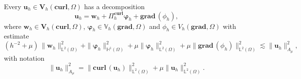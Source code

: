 \begin{proposition}\label{prop:Hitpmair-Xu decomposition}
Every $\bm{u}_h \in \bm{V}_h(\textbf{curl},\Omega)$ has a decomposition 
\begin{equation}\label{eq:Hitpmair-Xu-decomposition}
\bm{u}_h=\bm{w}_h+\Pi_h^{\textbf{curl}} \bm{\varphi}_h + \textbf{grad}\,(\phi_h),
\end{equation}
where $\bm{w}_h \in \bm{V}_h(\textbf{curl},\Omega)$, $\bm{\varphi}_h \in  \mathbb{V}_h(\textbf{grad},\Omega)$ and $\phi_h \in V_h(\textbf{grad},\Omega)$ with estimate
\begin{equation}\label{eq:Hitpmair-Xu-decomposition-estimate}
(h^{-2} + \mu) \, \|\bm{w}_h\|_{\mathbb{L}^2(\Omega)}^2 + \|\bm{\varphi}_h\|_{\mathbb{H}^1(\Omega)}^2 + \mu \|\bm{\varphi}_h\|_{\mathbb{L}^2(\Omega)}^2 + \mu \|\textbf{grad}\,(\phi_h)\|_{\mathbb{L}^2(\Omega)}^2 \lesssim \|\bm{u}_h\|_{A_\mu}^2,
\end{equation}
with notation
$$
\|\bm{u}_h\|_{A_\mu}^2= \|\textbf{curl} \,(\bm{u}_h)\|_{\mathbb{L}^2(\Omega)}^2 + \mu \|\bm{u}_h\|_{\mathbb{L}^2(\Omega)}^2.
$$
\end{proposition} 


